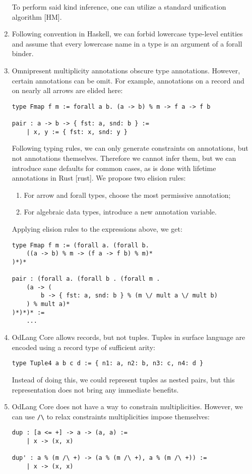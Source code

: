\documentclass[a4paper,14pt]{extreport}
\begin{document}
\begin{enumerate}
        To perform said kind inference, one can utilize a standard unification
        algorithm [HM].
    \item Following convention in Haskell, we can forbid lowercase type-level
        entities and assume that every lowercase name in a type is an argument
        of a forall binder.
    \item Omnipresent multiplicity annotations obscure type annotations.
        However, certain annotations can be omit. For example, annotations on a
        record and on nearly all arrows are elided here:
\begin{verbatim}
type Fmap f m := forall a b. (a -> b) % m -> f a -> f b

pair : a -> b -> { fst: a, snd: b } :=
    | x, y := { fst: x, snd: y }
\end{verbatim}
        Following typing rules, we can only generate constraints on annotations,
        but not annotations themselves. Therefore we cannot infer them, but we
        can introduce sane defaults for common cases, as is done with lifetime
        annotations in Rust [rust]. We propose two elision rules:
        \begin{enumerate}
            \item For arrow and forall types, choose the most permissive
                annotation;
            \item For algebraic data types, introduce a new annotation variable.
        \end{enumerate}
        Applying elision rules to the expressions above, we get:
\begin{verbatim}
type Fmap f m := (forall a. (forall b.
    ((a -> b) % m -> (f a -> f b) % m)*
)*)*

pair : (forall a. (forall b . (forall m .
    (a -> (
        b -> { fst: a, snd: b } % (m \/ mult a \/ mult b)
    ) % mult a)*
)*)*)* :=
    ...
\end{verbatim}
    \item OdLang Core allows records, but not tuples. Tuples in surface language
        are encoded using a record type of sufficient arity:
\begin{verbatim}
type Tuple4 a b c d := { n1: a, n2: b, n3: c, n4: d }
\end{verbatim}
        Instead of doing this, we could represent tuples as nested pairs, but
        this representation does not bring any immediate benefits.
    \item OdLang Core does not have a way to constrain multiplicities. However,
        we can use \verb|/\| to relax constraints multiplicities impose
        themselves:
\begin{verbatim}
dup : [a <= +] -> a -> (a, a) :=
    | x -> (x, x)

dup' : a % (m /\ +) -> (a % (m /\ +), a % (m /\ +)) :=
    | x -> (x, x)
\end{verbatim}
\end{enumerate}
\end{document}
